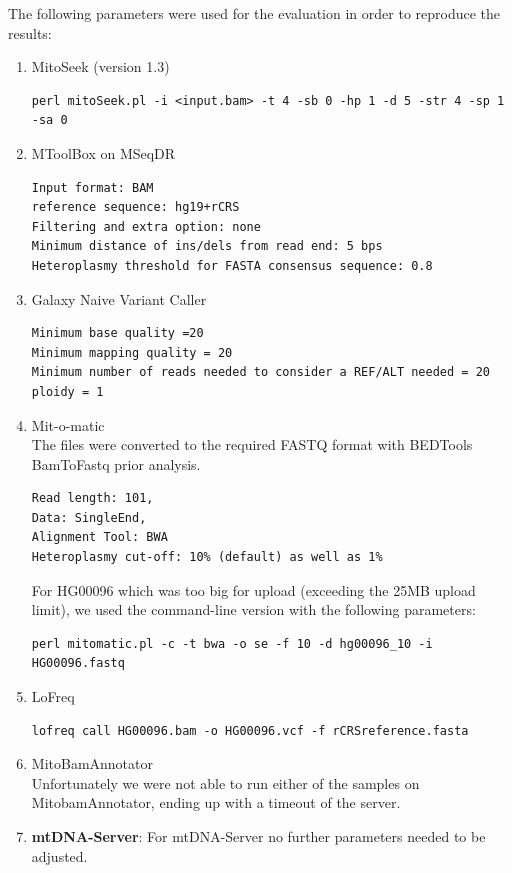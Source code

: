 The following parameters were used for the evaluation in order to reproduce the results:
\begin{enumerate}


\item MitoSeek (version 1.3)
\begin{lstlisting}
perl mitoSeek.pl -i <input.bam> -t 4 -sb 0 -hp 1 -d 5 -str 4 -sp 1 -sa 0
\end{lstlisting}
\item MToolBox on MSeqDR
\begin{lstlisting}
Input format: BAM 
reference sequence: hg19+rCRS 
Filtering and extra option: none 
Minimum distance of ins/dels from read end: 5 bps
Heteroplasmy threshold for FASTA consensus sequence: 0.8
\end{lstlisting}
\item Galaxy Naive Variant Caller
\begin{lstlisting}
Minimum base quality =20
Minimum mapping quality = 20
Minimum number of reads needed to consider a REF/ALT needed = 20 
ploidy = 1
\end{lstlisting}
\item Mit-o-matic\\
The files were converted to the required FASTQ format with BEDTools \cite{Quinlan2010} BamToFastq prior analysis.
\begin{lstlisting}
Read length: 101, 
Data: SingleEnd,
Alignment Tool: BWA
Heteroplasmy cut-off: 10% (default) as well as 1% 
\end{lstlisting}
For HG00096 which was too big for upload (exceeding the 25MB upload limit), we used the command-line version with the following parameters:
\begin{lstlisting}
perl mitomatic.pl -c -t bwa -o se -f 10 -d hg00096_10 -i HG00096.fastq
\end{lstlisting}
\item LoFreq
 \begin{lstlisting}
lofreq call HG00096.bam -o HG00096.vcf -f rCRSreference.fasta
\end{lstlisting}
\item  MitoBamAnnotator\\
Unfortunately we were not able to run either of the samples on MitobamAnnotator, ending up with a timeout of the server.
\item \textbf{mtDNA-Server}:
For mtDNA-Server no further parameters needed to be adjusted.
\end{enumerate}

